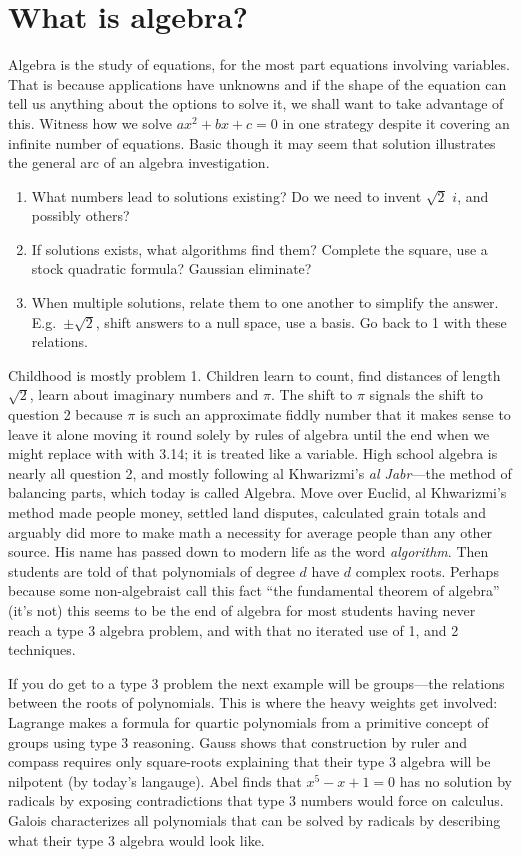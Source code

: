 \chapter{What is algebra?}

Algebra is the study of equations, for the most part equations involving variables.
That is because applications have unknowns and if 
the shape of the equation can tell us anything about the 
options to solve it, we shall want to take advantage of this.
Witness how we solve $ax^2+bx+c=0$ in one strategy despite it covering 
an infinite number of equations. Basic though it may seem that solution illustrates
the general arc of an algebra investigation.
\begin{enumerate}
    \item What numbers lead to solutions existing? Do we need to invent $\sqrt{2}$
    $i$, and possibly others?
    \item If solutions exists, what algorithms find them? Complete the square, 
        use a stock quadratic formula? Gaussian eliminate?
    \item When multiple solutions, relate them to one another to simplify the answer.  
    E.g.\ $\pm \sqrt{2}$, shift answers to a null space, use a basis.  Go 
    back to 1 with these relations.
\end{enumerate}
Childhood is mostly problem 1.  Children learn to count, find distances of
length $\sqrt{2}$, learn about imaginary numbers and $\pi$.  The shift to $\pi$
signals the shift to question 2 because $\pi$ is such an approximate fiddly
number that it makes sense to leave it alone moving it round solely by rules of
algebra until the end when we might replace with with 3.14; it is treated like a
variable. High school algebra is nearly all question 2, and mostly following al
Khwarizmi's \emph{al Jabr}---the method of balancing parts, which today is called 
Algebra.  Move over Euclid, al Khwarizmi's method made
people money, settled land disputes, calculated grain totals and arguably 
did more to make math a necessity for average people than any other source.
His name has passed down to modern life as the word \emph{algorithm}.
Then students are told of 
that polynomials of degree $d$ have $d$ complex
roots.  Perhaps because some non-algebraist call this fact ``the fundamental theorem
of algebra'' (it's not) this seems to be the end of algebra for most students having 
never reach a type 3 algebra problem, and with that no iterated use of 1, and 2 techniques.

If you do get to a type 3 problem the next example will be groups---the
relations between the roots of polynomials.  This is where the heavy weights get
involved: Lagrange makes a formula for quartic polynomials from a primitive
concept of groups using type 3 reasoning.  Gauss shows that construction by
ruler and compass requires only square-roots explaining that their type 3 algebra 
will be nilpotent (by today's langauge). Abel finds that $x^5-x+1=0$ has no 
solution by radicals by exposing contradictions that type 3 numbers 
would force on calculus.  Galois characterizes all polynomials that can be solved 
by radicals by describing what their type 3 algebra would look like.

